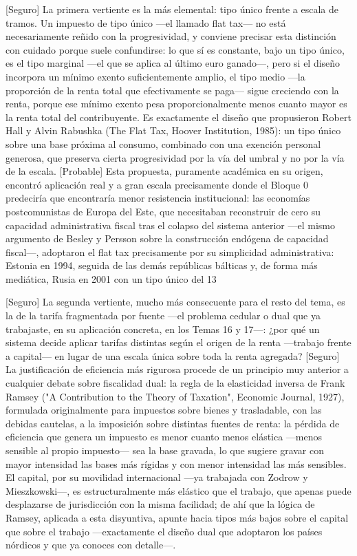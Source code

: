 \documentclass[10pt,a4paper]{article}
\begin{document}
[Seguro] La primera vertiente es la más elemental: tipo único frente a escala de tramos. Un impuesto de tipo único —el llamado flat tax— no está necesariamente reñido con la progresividad, y conviene precisar esta distinción con cuidado porque suele confundirse: lo que sí es constante, bajo un tipo único, es el tipo marginal —el que se aplica al último euro ganado—, pero si el diseño incorpora un mínimo exento suficientemente amplio, el tipo medio —la proporción de la renta total que efectivamente se paga— sigue creciendo con la renta, porque ese mínimo exento pesa proporcionalmente menos cuanto mayor es la renta total del contribuyente. Es exactamente el diseño que propusieron Robert Hall y Alvin Rabushka (The Flat Tax, Hoover Institution, 1985): un tipo único sobre una base próxima al consumo, combinado con una exención personal generosa, que preserva cierta progresividad por la vía del umbral y no por la vía de la escala. [Probable] Esta propuesta, puramente académica en su origen, encontró aplicación real y a gran escala precisamente donde el Bloque 0 predeciría que encontraría menor resistencia institucional: las economías postcomunistas de Europa del Este, que necesitaban reconstruir de cero su capacidad administrativa fiscal tras el colapso del sistema anterior —el mismo argumento de Besley y Persson sobre la construcción endógena de capacidad fiscal—, adoptaron el flat tax precisamente por su simplicidad administrativa: Estonia en 1994, seguida de las demás repúblicas bálticas y, de forma más mediática, Rusia en 2001 con un tipo único del 13%

[Seguro] La segunda vertiente, mucho más consecuente para el resto del tema, es la de la tarifa fragmentada por fuente —el problema cedular o dual que ya trabajaste, en su aplicación concreta, en los Temas 16 y 17—: ¿por qué un sistema decide aplicar tarifas distintas según el origen de la renta —trabajo frente a capital— en lugar de una escala única sobre toda la renta agregada? [Seguro] La justificación de eficiencia más rigurosa procede de un principio muy anterior a cualquier debate sobre fiscalidad dual: la regla de la elasticidad inversa de Frank Ramsey ("A Contribution to the Theory of Taxation", Economic Journal, 1927), formulada originalmente para impuestos sobre bienes y trasladable, con las debidas cautelas, a la imposición sobre distintas fuentes de renta: la pérdida de eficiencia que genera un impuesto es menor cuanto menos elástica —menos sensible al propio impuesto— sea la base gravada, lo que sugiere gravar con mayor intensidad las bases más rígidas y con menor intensidad las más sensibles. El capital, por su movilidad internacional —ya trabajada con Zodrow y Mieszkowski—, es estructuralmente más elástico que el trabajo, que apenas puede desplazarse de jurisdicción con la misma facilidad; de ahí que la lógica de Ramsey, aplicada a esta disyuntiva, apunte hacia tipos más bajos sobre el capital que sobre el trabajo —exactamente el diseño dual que adoptaron los países nórdicos y que ya conoces con detalle—.
\end{document}
